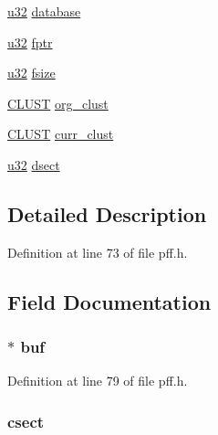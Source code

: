 \begin{DoxyCompactItemize}
\hyperlink{p8_2pinguino_2core_2typedef_8h_a2caf5cd7bcdbe1eefa727f44ffb10bac}{u32} \hyperlink{struct___f_a_t_f_s___ac121b6566ddcc660b5e92660aa0bbae1}{database}
\item 
\hyperlink{p8_2pinguino_2core_2typedef_8h_a2caf5cd7bcdbe1eefa727f44ffb10bac}{u32} \hyperlink{struct___f_a_t_f_s___a39df2f5f63960289dab619c491c61a63}{fptr}
\item 
\hyperlink{p8_2pinguino_2core_2typedef_8h_a2caf5cd7bcdbe1eefa727f44ffb10bac}{u32} \hyperlink{struct___f_a_t_f_s___a41a315139292b6c76b0327509c3ac625}{fsize}
\item 
\hyperlink{tff_8h_af322b62389c843d5727de4796a09f59c}{C\-L\-U\-S\-T} \hyperlink{struct___f_a_t_f_s___a5203f761bacf25758b7e736215f74349}{org\-\_\-clust}
\item 
\hyperlink{tff_8h_af322b62389c843d5727de4796a09f59c}{C\-L\-U\-S\-T} \hyperlink{struct___f_a_t_f_s___a32da77ccc2ccbe19278c7889417fb9a3}{curr\-\_\-clust}
\item 
\hyperlink{p8_2pinguino_2core_2typedef_8h_a2caf5cd7bcdbe1eefa727f44ffb10bac}{u32} \hyperlink{struct___f_a_t_f_s___a00baf8b1489c56d34413c3a628cdb9e6}{dsect}
\end{DoxyCompactItemize}


\subsection{Detailed Description}


Definition at line 73 of file pff.\-h.



\subsection{Field Documentation}
\hypertarget{struct___f_a_t_f_s___ad0d43b186dd10c19ec30b78082185a1d}{
\subsubsection[{buf}]{$\ast$ buf}}\label{struct___f_a_t_f_s___ad0d43b186dd10c19ec30b78082185a1d}


Definition at line 79 of file pff.\-h.

\hypertarget{struct___f_a_t_f_s___aa16ae553396fcffd4ec9c83901d859f1}{
\subsubsection[{csect}]{ csect}}\label{struct___f_a_t_f_s___aa16ae553396fcffd4ec9c83901d859f1}


